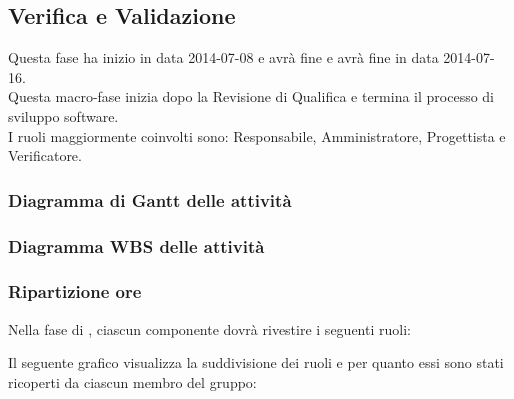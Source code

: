 \subsection{Verifica e Validazione}
Questa fase ha inizio in data 2014-07-08 e avrà fine e avrà fine in data 2014-07-16.\\
Questa macro-fase inizia dopo la Revisione di Qualifica e termina il processo di sviluppo software.\\
I ruoli maggiormente coinvolti sono: Responsabile, Amministratore, Progettista e Verificatore.


\subsubsection{Diagramma di Gantt delle attività}

\newpage
\subsubsection{Diagramma WBS delle attività}

\newpage
\subsubsection{Ripartizione ore}

\newpage
Nella fase di , ciascun componente dovrà rivestire i seguenti ruoli:

Il seguente grafico visualizza la suddivisione dei ruoli e per quanto essi sono stati ricoperti da ciascun membro del gruppo:
